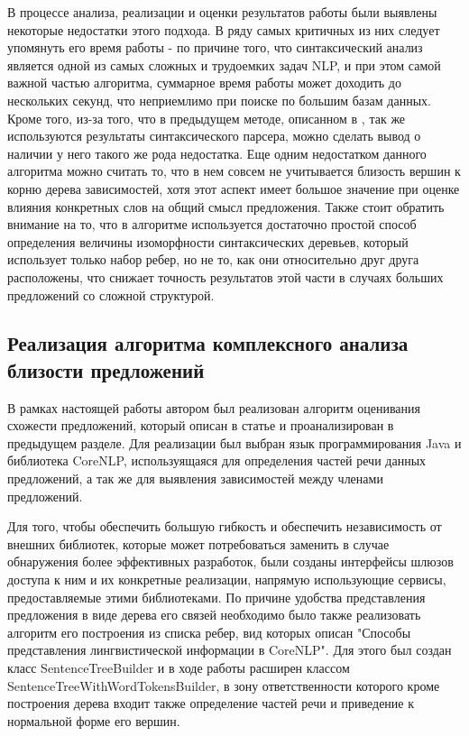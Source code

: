 В процессе анализа, реализации и оценки результатов работы были выявлены
некоторые недостатки этого подхода.
В ряду самых критичных из них следует упомянуть его время работы - 
по причине того, что синтаксический анализ является одной из самых
сложных и трудоемких задач NLP, и при этом самой важной частью алгоритма,
суммарное время работы может доходить до нескольких секунд,
что неприемлимо при поиске по большим базам данных.
Кроме того, из-за того, что в предыдущем методе, описанном в \cite{weightedDep},
так же используются результаты синтаксического парсера, можно сделать вывод
о наличии у него такого же рода недостатка.
Еще одним недостатком данного алгоритма можно считать то, что в нем совсем
не учитывается близость вершин к корню дерева зависимостей, хотя этот аспект
имеет большое значение при оценке влияния конкретных слов на общий смысл
предложения.
Также стоит обратить внимание на то, что в алгоритме
используется достаточно простой способ определения величины изоморфности
синтаксических деревьев, который использует только набор ребер, но не то,
как они относительно друг друга расположены, что снижает точность
результатов этой части в случаях больших предложений со сложной структурой.

\subsection{Реализация алгоритма комплексного анализа близости предложений}
В рамках настоящей работы автором был реализован алгоритм оценивания
схожести предложений, который описан в статье\cite{complexSim} и
проанализирован в предыдущем разделе.
Для реализации был выбран язык программирования Java и библиотека CoreNLP\cite{corenlp},
используящаяся для определения частей речи данных предложений, а так же для выявления зависимостей
между членами предложений.

Для того, чтобы обеспечить большую гибкость и обеспечить независимость от внешних библиотек,
которые может потребоваться заменить в случае обнаружения более эффективных разработок,
были созданы интерфейсы шлюзов доступа к ним и их конкретные реализации, напрямую
использующие сервисы, предоставляемые этими библиотеками.
По причине удобства представления предложения в виде дерева его связей
необходимо было также реализовать алгоритм его построения из списка ребер, 
вид которых описан "Способы представления лингвистической информации в CoreNLP".
Для этого был создан класс SentenceTreeBuilder и в ходе работы расширен
классом SentenceTreeWithWordTokensBuilder, в зону ответственности которого
кроме построения дерева входит также определение частей речи и приведение к нормальной форме
его вершин.

